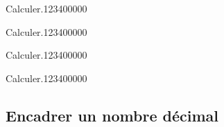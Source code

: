 \begin{pageAD} 


\begin{ExoCad}{Calculer.}{1234}{0}{0}{0}{0}{0}

\end{ExoCad}


\begin{ExoCad}{Calculer.}{1234}{0}{0}{0}{0}{0}

\end{ExoCad}


\begin{ExoCad}{Calculer.}{1234}{0}{0}{0}{0}{0}

\end{ExoCad}


\begin{ExoCad}{Calculer.}{1234}{0}{0}{0}{0}{0}

\end{ExoCad}
 
\end{pageAD}
\begin{pageCours}

\section{Encadrer un nombre décimal}

 

\end{pageCours}
